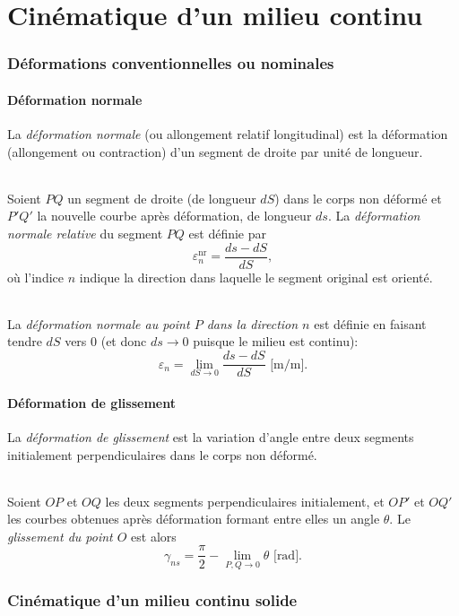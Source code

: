 \part{Cinématique d'un milieu continu}
\section{Déformations conventionnelles ou nominales}
\subsection{Déformation normale}
La \emph{déformation normale} (ou allongement relatif longitudinal) est la déformation (allongement ou contraction) d'un segment de droite par unité de longueur.
\paragraph{}
Soient $PQ$ un segment de droite (de longueur $dS$) dans le corps non déformé et $P'Q'$ la nouvelle courbe après déformation, de longueur $ds$. La \emph{déformation normale relative} du segment $PQ$ est définie par
$$\varepsilon_n^{\text{nr}}=\frac{ds-dS}{dS},$$ où l'indice $n$ indique la direction dans laquelle le segment original est orienté.
\paragraph{}
La \emph{déformation normale au point $P$ dans la direction $n$} est définie en faisant tendre $dS$ vers 0 (et donc $ds\rightarrow 0$ puisque le milieu est continu):
$$\varepsilon_n=\lim_{dS\rightarrow 0}\frac{ds-dS}{dS} \text{  [m/m]}.$$

\subsection{Déformation de glissement}
La \emph{déformation de glissement} est la variation d'angle entre deux segments initialement perpendiculaires dans le corps non déformé.
\paragraph{}
Soient $OP$ et $OQ$ les deux segments perpendiculaires initialement, et $OP'$ et $OQ'$ les courbes obtenues après déformation formant entre elles un angle $\theta$. Le \emph{glissement du point $O$} est alors
$$\gamma_{ns}=\frac{\pi}{2}-\lim_{P,Q\rightarrow 0}\theta \text{ [rad]}.$$

\section{Cinématique d'un milieu continu solide}

